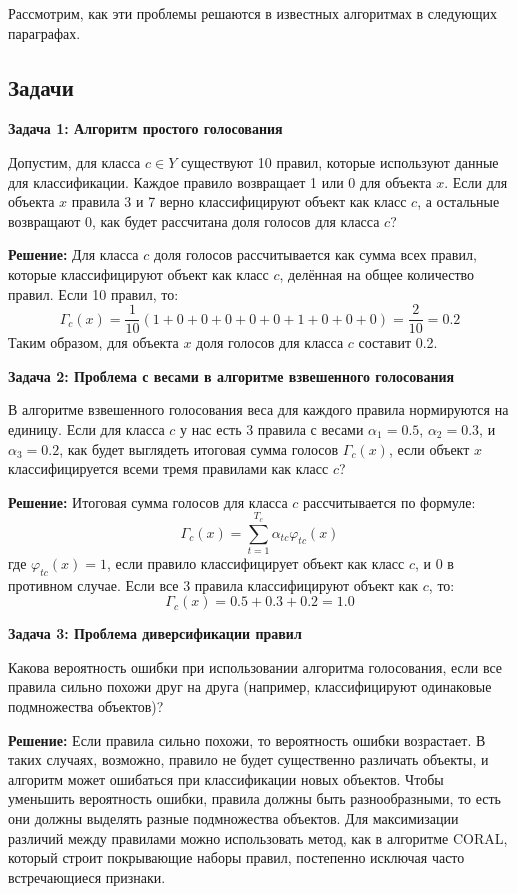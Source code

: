 Рассмотрим, как эти проблемы решаются в известных алгоритмах в следующих параграфах.

\subsection{Задачи}

\textbf{Задача 1: Алгоритм простого голосования}

Допустим, для класса $c \in Y$ существуют 10 правил, которые используют данные для классификации. Каждое правило возвращает 1 или 0 для объекта $x$. Если для объекта $x$ правила 3 и 7 верно классифицируют объект как класс $c$, а остальные возвращают 0, как будет рассчитана доля голосов для класса $c$?

\textbf{Решение:}  
Для класса $c$ доля голосов рассчитывается как сумма всех правил, которые классифицируют объект как класс $c$, делённая на общее количество правил. Если 10 правил, то:
\[
\Gamma_c(x) = \frac{1}{10} \left( 1 + 0 + 0 + 0 + 0 + 0 + 1 + 0 + 0 + 0 \right) = \frac{2}{10} = 0.2
\]
Таким образом, для объекта $x$ доля голосов для класса $c$ составит 0.2.

\textbf{Задача 2: Проблема с весами в алгоритме взвешенного голосования}

В алгоритме взвешенного голосования веса для каждого правила нормируются на единицу. Если для класса $c$ у нас есть 3 правила с весами $\alpha_1 = 0.5$, $\alpha_2 = 0.3$, и $\alpha_3 = 0.2$, как будет выглядеть итоговая сумма голосов $\Gamma_c(x)$, если объект $x$ классифицируется всеми тремя правилами как класс $c$?

\textbf{Решение:}  
Итоговая сумма голосов для класса $c$ рассчитывается по формуле:
\[
\Gamma_c(x) = \sum_{t=1}^{T_c} \alpha_{tc} \varphi_{tc}(x)
\]
где $\varphi_{tc}(x) = 1$, если правило классифицирует объект как класс $c$, и 0 в противном случае. Если все 3 правила классифицируют объект как $c$, то:
\[
\Gamma_c(x) = 0.5 + 0.3 + 0.2 = 1.0
\]

\textbf{Задача 3: Проблема диверсификации правил}

Какова вероятность ошибки при использовании алгоритма голосования, если все правила сильно похожи друг на друга (например, классифицируют одинаковые подмножества объектов)?

\textbf{Решение:}  
Если правила сильно похожи, то вероятность ошибки возрастает. В таких случаях, возможно, правило не будет существенно различать объекты, и алгоритм может ошибаться при классификации новых объектов. Чтобы уменьшить вероятность ошибки, правила должны быть разнообразными, то есть они должны выделять разные подмножества объектов. Для максимизации различий между правилами можно использовать метод, как в алгоритме CORAL, который строит покрывающие наборы правил, постепенно исключая часто встречающиеся признаки.

